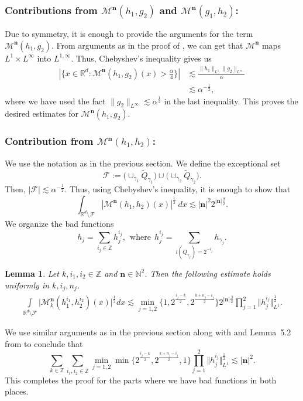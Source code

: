 \documentclass[a4paper,reqno]{amsart}
\newtheorem{lemma}{Lemma}[section]
\newcounter{old}
\numberwithin{equation}{section}
\begin{document}
	\subsubsection*{\bf Contributions from $\mathcal{M}^{\mathbf{n}}(h_1,g_2)$ and $\mathcal{M}^{\mathbf{n}}(g_1,h_2)$: }
	Due to symmetry, it is enough to provide the arguments for the term $\mathcal{M}^{\mathbf{n}}(h_1,g_2)$. From arguments as in the proof of , we can get that $\mathcal{M}^{\mathbf{n}}$ maps $L^1\times L^\infty$ into $L^{1,\infty}$. Thus, Chebyshev's inequality gives us
	\begin{align*}
		|\{x\in \mathbb{R}^{d}:\mathcal{M}^{\mathbf{n}}(h_1,g_2)(x)>\frac{\alpha}{4}\}|&\lesssim \frac{\|h_1\|_{L^1}\|g_2\|_{L^\infty}}{\alpha}\\
		&\lesssim \alpha^{-\frac{1}{2}},
	\end{align*}
	where we have used the fact $\|g_2\|_{L^\infty}\lesssim\alpha^{\frac{1}{2}}$ in the last inequality. This proves the desired estimates for $\mathcal{M}^{\mathbf{n}}(h_1,g_2)$.
	\subsubsection*{\bf Contribution from $\mathcal{M}^{\mathbf{n}}(h_1,h_2)$:}
	We use the notation as in the previous section. We define the exceptional set 
	\[\mathcal{F}:=\Big(\cup_{\gamma_1}\tilde{Q}_{\gamma_1}\Big)\cup \Big(\cup_{\gamma_2}\tilde{Q}_{\gamma_2}\Big).\]
	Then, $|\mathcal{F}|\lesssim\alpha^{-\frac{1}{2}}$. Thus, using Chebyshev's inequality, it is enough to show that 
	\[\int_{\mathbb{R}^d\setminus \mathcal{F}}|\mathcal{M}^{\mathbf{n}}(h_1,h_2)(x)|^{\frac{1}{2}}~dx\lesssim |\mathbf{n}|^{2}2^{|\mathbf{n}|\frac{\beta}{2}}.\]
	We organize the bad functions  
	\[h_{j}=\sum_{i_j\in\mathbb{Z}}h^{i_j}_{j},~~\text{where}~~h^{i_j}_{j}=\sum_{l(Q_{\gamma_j})=2^{-i_j}}h_{\gamma_j}.\]
	\begin{lemma}\label{badfunction}
		Let $k,i_1,i_2\in\mathbb{Z}$ and $\mathbf{n}\in\mathbb{N}^2$. Then the following estimate holds uniformly in $k,i_j,n_j$.
		\begin{align*}
			\int\limits_{\mathbb{R}^{d}\setminus \mathcal{F}}\Big|\mathcal{M}^{\mathbf{n}}_k(h^{i_1}_1,h^{i_2}_2)(x)\Big|^{\frac{1}{2}}dx\lesssim \min_{j=1,2}\{1,2^{\frac{i_j-k}{2}},2^{\frac{k+n_j-i_j}{2}}\}2^{|\mathbf{n}|\frac{\beta}{2}}\prod^{2}_{j=1}\Vert h^{i_j}_{j}\Vert^{\frac{1}{2}}_{L^{1}}.
		\end{align*} 
	\end{lemma}
	We use similar arguments as in the previous section along with  and Lemma~5.2 from \cite{ChristZhou} to conclude that 
	\[\sum_{k\in\mathbb{Z}}\sum_{i_1,i_2\in\mathbb{Z}}\min_{j=1,2}\min\Big\{2^{\frac{i_j-k}{2}},2^{\frac{k+n_j-i_j}{2}},1\Big\}\prod^{2}_{j=1}\Vert h^{i_j}_{j}\Vert^{\frac{1}{2}}_{L^{1}}\lesssim |\mathbf{n}|^{2}.\]
	This completes the proof for the parts where we have bad functions in both places.  
\end{document}
